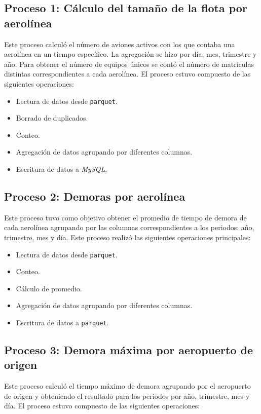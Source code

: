 \subsection{Proceso 1: Cálculo del tamaño de la flota por aerolínea}

Este proceso calculó el número de aviones activos con los que contaba una aerolínea en un tiempo específico. La agregación se hizo por día, mes, trimestre y año. Para obtener el número de equipos únicos se contó el número de matrículas distintas correspondientes a cada aerolínea. El proceso estuvo compuesto de las siguientes operaciones:

\begin{itemize}
	\item Lectura de datos desde \texttt{parquet}.
	\item Borrado de duplicados.
	\item Conteo.
	\item Agregación de datos agrupando por diferentes columnas.
	\item Escritura de datos a \textit{MySQL}.
\end{itemize}

\subsection{Proceso 2: Demoras por aerolínea}

Este proceso tuvo como objetivo obtener el promedio de tiempo de demora de cada aerolínea agrupando por las columnas correspondientes a los periodos: año, trimestre, mes y día. Este proceso realizó las siguientes operaciones principales:

\begin{itemize}
	\item Lectura de datos desde \texttt{parquet}.
	\item Conteo.
	\item Cálculo de promedio.
	\item Agregación de datos agrupando por diferentes columnas.
	\item Escritura de datos a \texttt{parquet}.
\end{itemize}

\subsection{Proceso 3: Demora máxima por aeropuerto de origen}

Este proceso calculó el tiempo máximo de demora agrupando por el aeropuerto de origen y obteniendo el resultado para los periodos por año, trimestre, mes y día. El proceso estuvo compuesto de las siguientes operaciones:

